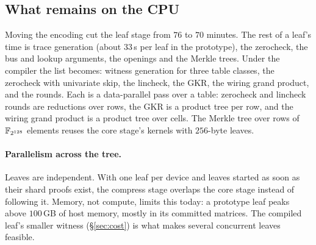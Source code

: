 \subsection{What remains on the CPU}

Moving the encoding cut the leaf stage from $76$ to $70$ minutes. The rest of a leaf's time is trace generation (about $33$\,s per leaf in the prototype), the zerocheck, the bus and lookup arguments, the openings and the \Blake{} Merkle trees. Under the compiler the list becomes: witness generation for three table classes, the zerocheck with univariate skip, the lincheck, the \MUL{} GKR, the wiring grand product, and the \WHIR{} rounds. Each is a data-parallel pass over a table: zerocheck and lincheck rounds are reductions over rows, the \MUL{} GKR is a product tree per row, and the wiring grand product is a product tree over cells. The \Blake{} Merkle tree over rows of $\mathbb{F}_{2^{128}}$ elements reuses the core stage's \Blake{} kernels with $256$-byte leaves.

\paragraph{Parallelism across the tree.} Leaves are independent. With one leaf per device and leaves started as soon as their shard proofs exist, the compress stage overlaps the core stage instead of following it. Memory, not compute, limits this today: a prototype leaf peaks above $100$\,GB of host memory, mostly in its committed matrices. The compiled leaf's smaller witness (\S\ref{sec:cost}) is what makes several concurrent leaves feasible.
